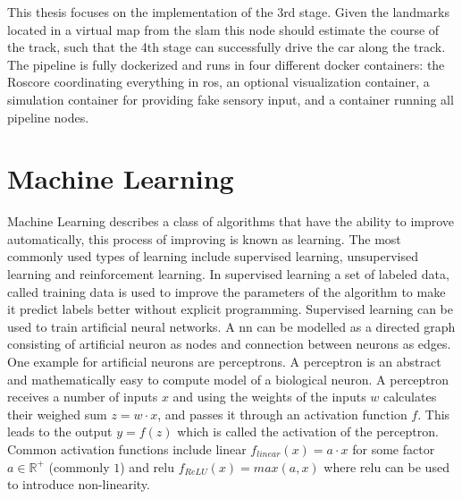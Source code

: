 This thesis focuses on the implementation of the 3rd stage. Given the landmarks located in a virtual map from the \ac{slam} this node should estimate the course of the track, such that the 4th stage can successfully drive the car along the track.
The pipeline is fully dockerized and runs in four different docker containers: the Roscore coordinating everything in \ac{ros}, an optional visualization container, a simulation container for providing fake sensory input, and a container running all pipeline nodes.

\section{Machine Learning}
Machine Learning describes a class of algorithms that have the ability to improve automatically, this process of improving is known as learning. The most commonly used types of learning include supervised learning, unsupervised learning and reinforcement learning\cite{Dey2016}. In supervised learning a set of labeled data, called training data is used to improve the parameters of the algorithm to make it predict labels better without explicit programming. Supervised learning can be used to train artificial neural networks. A \ac{nn} can be modelled as a directed graph consisting of artificial neuron as nodes and connection between neurons as edges. One example for artificial neurons are perceptrons. A perceptron is an abstract and mathematically easy to compute model of a biological neuron. A perceptron receives a number of inputs $x$ and using the weights of the inputs $w$ calculates their weighed sum $z=w \cdot x$, and passes it through an activation function $f$. This leads to the output
$y=f(z)$ which is called the activation of the perceptron. Common activation functions include linear $f_{linear}(x)=a \cdot x$ for some factor $a \in \mathbb{R^+}$ (commonly $1$) and \ac{relu} $f_{ReLU}(x)=max(a,x)$ \cite{Ramachandran2017} where \ac{relu} can be used to introduce non-linearity.

